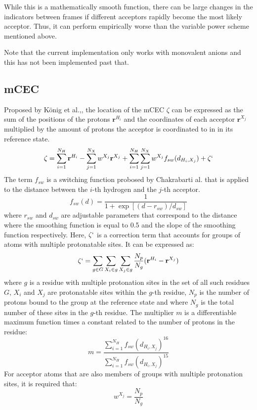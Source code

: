 \documentclass{article}
\newcommand{\mb}[1]{\mathbf{#1}}
\begin{document}
While this is a mathematically smooth function, there can be large changes in the indicators between frames if different acceptors rapidly become the most likely acceptor.
Thus, it can perform empirically worse than the variable power scheme mentioned above.

Note that the current implementation only works with monovalent anions and this has not been implemented past that.

\subsection{mCEC}
Proposed by K\"onig et al.,\cite{Konig2006}, the location of the mCEC $\zeta$ can be expressed as the sum of the positions of the protons $\mb{r}^{H_i}$ and the coordinates of each acceptor $\mb{r}^{X_j}$ multiplied by the amount of protons the acceptor is coordinated to in in its reference state.
\begin{equation}\label{eq:mcec}
\mb{\zeta} = \sum_{i=1}^{N_H} \mb{r}^{H_i} - \sum_{j=1}^{N_X} w^{X_j} \mb{r}^{X_j} + \sum_{i=1}^{N_H} \sum_{j=1}^{N_X} w^{X_j} f_{sw}(d_{H_i,X_j}) + \zeta`
\end{equation}
The term $f_{sw}$ is a switching function probosed by Chakrabarti al.\cite{Chakrabarti2004} that is applied to the distance between the $i$-th hydrogen and the $j$-th acceptor.
\begin{equation}\label{eq:chakra}
f_{sw}(d) = \frac{1}{1 + \exp[(d-r_{sw})/d_{sw}]}
\end{equation}
where $r_{sw}$ and $d_{sw}$ are adjustable parameters that correspond to the distance where the smoothing function is equal to 0.5 and the slope of the smoothing function respectively.
Here, $\zeta`$ is a correction term that accounts for groups of atoms with multiple protonatable sites. It can be expressed as:
\begin{equation}
\mb{\zeta}` = \sum_{g \in G} \sum_{X_i\in g}\sum_{X_j \in g} \frac{N_p}{N_g} (\mb{r}^{H_i} - \mb{r}^{X_j})
\end{equation}
where $g$ is a residue with multiple protonation sites in the set of all such residues $G$, $X_i$ and $X_j$ are protonatable sites within the $g$-th residue, $N_p$ is the number of protons bound to the group at the reference state and where $N_g$ is the total number of these sites in the $g$-th residue. 
The multiplier $m$ is a differentiable maximum function times a constant related to the number of protons in the residue:
\begin{equation}
m = \frac{\sum_{i=1}^{N_H} f_{sw}(d_{H_i,X_j})^{16}}{\sum_{i=1}^{N_H}  f_{sw}(d_{H_i,X_j})^{15}}
\end{equation}
For acceptor atoms that are also members of groups with multiple protonation sites, it is required that:
\begin{equation}
w^{X_j} = \frac{N_p}{N_g}
\end{equation}
\end{document}
